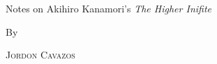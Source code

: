 \documentclass{article}
\theoremstyle{definition}
\theoremstyle{remark}
\begin{document}
\begin{titlepage}
	\vspace{2\baselineskip} %
	
	
	Notes on Akihiro Kanamori's \emph{The Higher Inifite} %
	
	\vspace*{3\baselineskip} %
	
	
	By
	
	\vspace{0.5\baselineskip} %
	
	{\scshape\Large Jordon Cavazos\\} %
	
	\vspace{0.5\baselineskip} %
	
	
	\vfill %
	
	
	
	\vspace{0.3\baselineskip} %
	

\end{titlepage}
\end{document}
